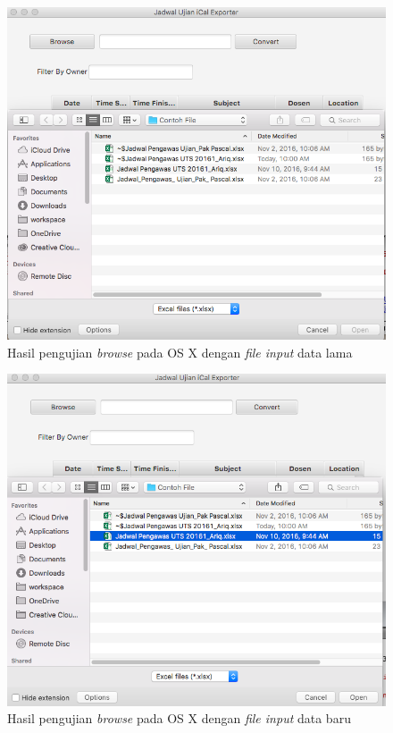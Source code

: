 		\begin{figure}[H]
			\centering
			\includegraphics[scale=0.5]{Gambar/BrowseonMac}
			\caption{Hasil pengujian \textit{browse} pada OS X dengan \textit{file input} data lama}
			\label{fig:BrowseonMac}
			\end{figure}
		
		
		\begin{figure}[H]
			\centering
			\includegraphics[scale=0.5]{Gambar/BrowseDatabaruonMac}
			\caption{Hasil pengujian \textit{browse} pada OS X dengan \textit{file input} data baru}
			\label{fig:BrowseDatabaruonMac}
			\end{figure}
			
